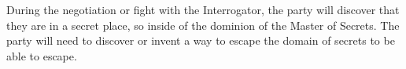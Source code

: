 During the negotiation or fight with the Interrogator, the party will discover that they are in a secret place, so inside of the dominion of the Master of Secrets.
The party will need to discover or invent a way to escape the domain of secrets to be able to escape.


